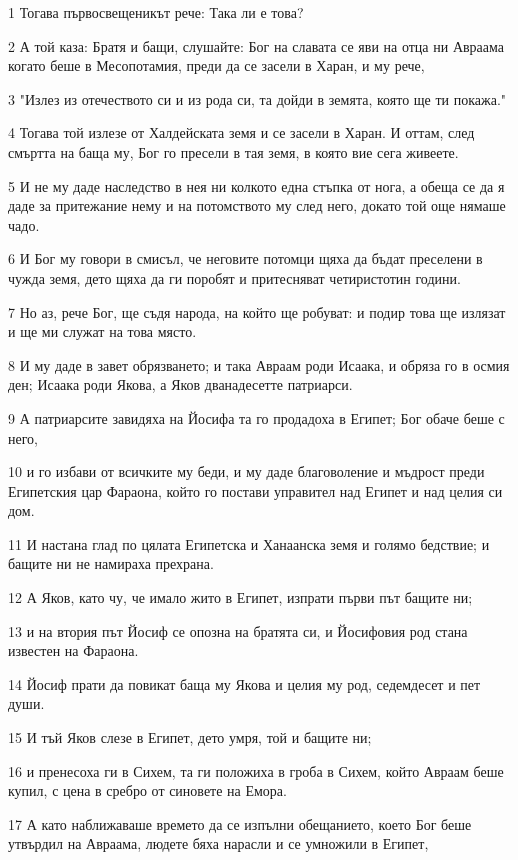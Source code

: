 \par 1 Тогава първосвещеникът рече: Така ли е това?
\par 2 А той каза: Братя и бащи, слушайте: Бог на славата се яви на отца ни Авраама когато беше в Месопотамия, преди да се засели в Харан, и му рече,
\par 3 "Излез из отечеството си и из рода си, та дойди в земята, която ще ти покажа."
\par 4 Тогава той излезе от Халдейската земя и се засели в Харан. И оттам, след смъртта на баща му, Бог го пресели в тая земя, в която вие сега живеете.
\par 5 И не му даде наследство в нея ни колкото една стъпка от нога, а обеща се да я даде за притежание нему и на потомството му след него, докато той още нямаше чадо.
\par 6 И Бог му говори в смисъл, че неговите потомци щяха да бъдат преселени в чужда земя, дето щяха да ги поробят и притесняват четиристотин години.
\par 7 Но аз, рече Бог, ще съдя народа, на който ще робуват: и подир това ще излязат и ще ми служат на това място.
\par 8 И му даде в завет обрязването; и така Авраам роди Исаака, и обряза го в осмия ден; Исаака роди Якова, а Яков дванадесетте патриарси.
\par 9 А патриарсите завидяха на Йосифа та го продадоха в Египет; Бог обаче беше с него,
\par 10 и го избави от всичките му беди, и му даде благоволение и мъдрост преди Египетския цар Фараона, който го постави управител над Египет и над целия си дом.
\par 11 И настана глад по цялата Египетска и Ханаанска земя и голямо бедствие; и бащите ни не намираха прехрана.
\par 12 А Яков, като чу, че имало жито в Египет, изпрати първи път бащите ни;
\par 13 и на втория път Йосиф се опозна на братята си, и Йосифовия род стана известен на Фараона.
\par 14 Йосиф прати да повикат баща му Якова и целия му род, седемдесет и пет души.
\par 15 И тъй Яков слезе в Египет, дето умря, той и бащите ни;
\par 16 и пренесоха ги в Сихем, та ги положиха в гроба в Сихем, който Авраам беше купил, с цена в сребро от синовете на Емора.
\par 17 А като наближаваше времето да се изпълни обещанието, което Бог беше утвърдил на Авраама, людете бяха нарасли и се умножили в Египет,
